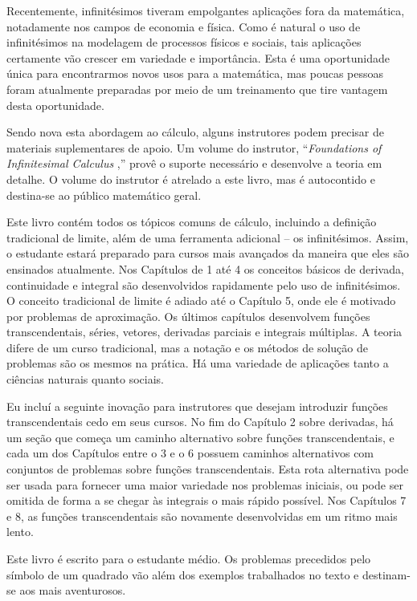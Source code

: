 \documentclass{svmono}
\begin{document}
Recentemente, infinitésimos tiveram empolgantes aplicações fora
da matemática, notadamente nos campos de economia e física. Como
é natural o uso de infinitésimos na modelagem de processos físicos
e sociais, tais aplicações certamente vão crescer em variedade
e importância. Esta é uma oportunidade única para encontrarmos
novos usos para a matemática, mas poucas pessoas foram atualmente
preparadas por meio de um treinamento que tire vantagem desta
oportunidade.

Sendo nova esta abordagem ao cálculo, alguns instrutores podem
precisar de materiais suplementares de apoio. Um volume do instrutor,
``\emph{Foundations of Infinitesimal Calculus}%
%
,'' provê o suporte necessário e desenvolve a teoria em detalhe. O
volume do instrutor é atrelado a este livro, mas é autocontido
e destina-se ao público matemático geral.

Este livro contém todos os tópicos comuns de cálculo, incluindo a
definição tradicional de limite, além de uma ferramenta adicional
-- os infinitésimos. Assim, o estudante estará preparado para
cursos mais avançados da maneira que eles são ensinados atualmente.
Nos Capítulos de 1 até 4 os conceitos básicos de derivada, continuidade
e integral são desenvolvidos rapidamente pelo uso de infinitésimos. O
conceito tradicional de limite é adiado até o Capítulo 5, onde ele
é motivado por problemas de aproximação. Os últimos capítulos desenvolvem
funções transcendentais, séries, vetores, derivadas parciais e integrais
múltiplas. A teoria difere de um curso tradicional, mas a notação e os
métodos de solução de problemas são os mesmos na prática. Há uma variedade
de aplicações tanto a ciências naturais quanto sociais.

Eu incluí a seguinte inovação para instrutores que desejam introduzir
funções transcendentais cedo em seus cursos. No fim do Capítulo 2 sobre
derivadas, há um seção que começa um caminho alternativo sobre funções
transcendentais, e cada um dos Capítulos entre o 3 e o 6 possuem
caminhos alternativos com conjuntos de problemas sobre funções
transcendentais. Esta rota alternativa pode ser usada para fornecer
uma maior variedade nos problemas iniciais, ou pode ser omitida de
forma a se chegar às integrais o mais rápido possível. Nos Capítulos
7 e 8, as funções transcendentais são novamente desenvolvidas em um
ritmo mais lento.

Este livro é escrito para o estudante médio. Os problemas precedidos pelo
símbolo de um quadrado vão além dos exemplos trabalhados no texto e
destinam-se aos mais aventurosos.
\end{document}
